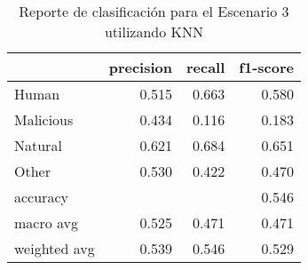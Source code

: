 \begin{table}
\centering
\caption{Reporte de clasificación para el Escenario 3 utilizando KNN}
\label{tab:KNN_Escenario 3}
\begin{tabular}{lrrr}
\toprule
{} &  precision &  recall &  f1-score \\
\midrule
Human        &      0.515 &   0.663 &     0.580 \\
Malicious    &      0.434 &   0.116 &     0.183 \\
Natural      &      0.621 &   0.684 &     0.651 \\
Other        &      0.530 &   0.422 &     0.470 \\
accuracy     &            &         &     0.546 \\
macro avg    &      0.525 &   0.471 &     0.471 \\
weighted avg &      0.539 &   0.546 &     0.529 \\
\bottomrule
\end{tabular}
\end{table}
